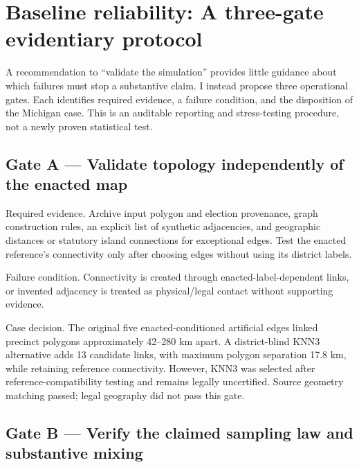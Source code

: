 \documentclass[
  10pt,
]{article}
\begin{document}
\hypertarget{baseline-reliability-a-three-gate-evidentiary-protocol}{%
\section{Baseline reliability: A three-gate evidentiary
protocol}\label{baseline-reliability-a-three-gate-evidentiary-protocol}}

A recommendation to ``validate the simulation'' provides little guidance
about which failures must stop a substantive claim. I instead propose
three operational gates. Each identifies required evidence, a failure
condition, and the disposition of the Michigan case. This is an
auditable reporting and stress-testing procedure, not a newly proven
statistical test.

\hypertarget{gate-a-validate-topology-independently-of-the-enacted-map}{%
\subsection{Gate A --- Validate topology independently of the enacted
map}\label{gate-a-validate-topology-independently-of-the-enacted-map}}

Required evidence. Archive input polygon and election provenance, graph
construction rules, an explicit list of synthetic adjacencies, and
geographic distances or statutory island connections for exceptional
edges. Test the enacted reference's connectivity only after choosing
edges without using its district labels.

Failure condition. Connectivity is created through
enacted-label-dependent links, or invented adjacency is treated as
physical/legal contact without supporting evidence.

Case decision. The original five enacted-conditioned artificial edges
linked precinct polygons approximately 42--280 km apart. A
district-blind KNN3 alternative adds 13 candidate links, with maximum
polygon separation 17.8 km, while retaining reference connectivity.
However, KNN3 was selected after reference-compatibility testing and
remains legally uncertified. Source geometry matching passed; legal
geography did not pass this gate.

\hypertarget{gate-b-verify-the-claimed-sampling-law-and-substantive-mixing}{%
\subsection{Gate B --- Verify the claimed sampling law and substantive
mixing}\label{gate-b-verify-the-claimed-sampling-law-and-substantive-mixing}}
\end{document}

